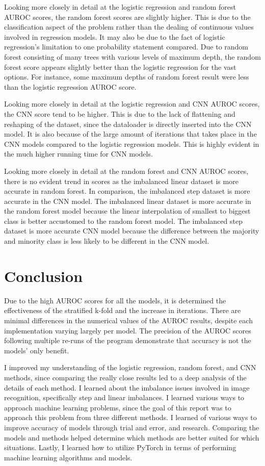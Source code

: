 \documentclass[conference]{IEEEtran}
\begin{document}
Looking more closely in detail at the logistic regression and random forest AUROC scores, the random forest scores are slightly higher. This is due to the classification aspect of the problem rather than the dealing of continuous values involved in regression models. It may also be due to the fact of logistic regression's limitation to one probability statement compared. Due to random forest consisting of many trees with various levels of maximum depth, the random forest score appears slightly better than the logistic regression for the vast options. For instance, some maximum depths of random forest result were less than the logistic regression AUROC score.

Looking more closely in detail at the logistic regression and CNN AUROC scores, the CNN score tend to be higher. This is due to the lack of flattening and reshaping of the dataset, since the dataloader is directly inserted into the CNN model. It is also because of the large amount of iterations that takes place in the CNN models compared to the logistic regression models. This is highly evident in the much higher running time for CNN models.  

Looking more closely in detail at the random forest and CNN AUROC scores, there is no evident trend in scores as the imbalanced linear dataset is more accurate in random forest. In comparison, the imbalanced step dataset is more accurate in the CNN model. The imbalanced linear dataset is more accurate in the random forest model because the linear interpolation of smallest to biggest class is better accustomed to the random forest model. The imbalanced step dataset is more accurate  CNN model because the difference between the majority and minority class is less likely to be different in the CNN model. 


\section{Conclusion}
Due to the high AUROC scores for all the models, it is determined the effectiveness of the stratified k-fold and the increase in iterations. There are minimal differences in the numerical values of the AUROC results, despite each implementation varying largely per model. The precision of the AUROC scores following multiple re-runs of the program demonstrate that accuracy is not the models' only benefit. 

I improved my understanding of the logistic regression, random forest, and CNN methods, since comparing the really close results led to a deep analysis of the details of each method. I learned about the imbalance issues involved in image recognition, specifically step and linear imbalances. I learned various ways to approach machine learning problems, since the goal of this report was to approach this problem from three different methods. I learned of various ways to improve accuracy of models through trial and error, and research. Comparing the models and methods helped determine which methods are better suited for which situations. Lastly, I learned how to utilize PyTorch in terms of performing machine learning algorithms and models.
\end{document}
